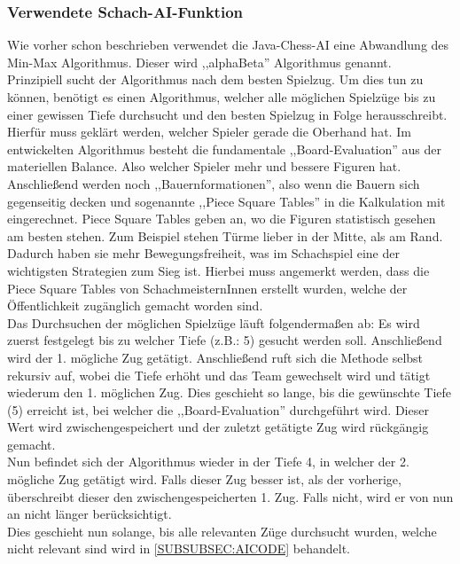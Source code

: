 \documentclass[12pt,a4paper]{article}
\begin{document}
{\subsubsection{Verwendete Schach-AI-Funktion}
\label{SUBSUBSEC:OurAI}

Wie vorher schon beschrieben verwendet die Java-Chess-AI eine Abwandlung des Min-Max Algorithmus. Dieser wird ,,alphaBeta'' Algorithmus genannt. \\
Prinzipiell sucht der Algorithmus nach dem besten Spielzug. Um dies tun zu können, benötigt es einen Algorithmus, welcher alle möglichen Spielzüge bis zu einer gewissen Tiefe durchsucht und den besten Spielzug in Folge herausschreibt. \\ 
Hierfür muss geklärt werden, welcher Spieler gerade die Oberhand hat. Im entwickelten Algorithmus besteht die fundamentale ,,Board-Evaluation'' aus der materiellen Balance. Also welcher Spieler mehr und bessere Figuren hat. Anschließend werden noch  ,,Bauernformationen'', also wenn die Bauern sich gegenseitig decken und sogenannte ,,Piece Square Tables'' in die Kalkulation mit eingerechnet. Piece Square Tables geben an, wo die Figuren statistisch gesehen am besten stehen. Zum Beispiel stehen Türme lieber in der Mitte, als am Rand. Dadurch haben sie mehr Bewegungsfreiheit, was im Schachspiel eine der wichtigsten Strategien zum Sieg ist. Hierbei muss angemerkt werden, dass die Piece Square Tables von SchachmeisternInnen erstellt wurden, welche der Öffentlichkeit zugänglich gemacht worden sind.\cite{SquareTables} \\[2ex]
Das Durchsuchen der möglichen Spielzüge läuft folgendermaßen ab: Es wird zuerst festgelegt bis zu welcher Tiefe (z.B.: 5) gesucht werden soll. Anschließend wird der 1. mögliche Zug getätigt. Anschließend ruft sich die Methode selbst rekursiv auf, wobei die Tiefe erhöht und das Team gewechselt wird und tätigt wiederum den 1. möglichen Zug. Dies geschieht so lange, bis die gewünschte Tiefe (5) erreicht ist, bei welcher die ,,Board-Evaluation'' durchgeführt wird. Dieser Wert wird zwischengespeichert und der zuletzt getätigte Zug wird rückgängig gemacht. \\
Nun befindet sich der Algorithmus wieder in der Tiefe 4, in welcher der 2. mögliche Zug getätigt wird. Falls dieser Zug besser ist, als der vorherige, überschreibt dieser den zwischengespeicherten 1. Zug. Falls nicht, wird er von nun an nicht länger berücksichtigt. \\
Dies geschieht nun solange, bis alle relevanten Züge durchsucht wurden, welche nicht relevant sind wird in \ref{SUBSUBSEC:AICODE} behandelt. \\
}
\end{document}
